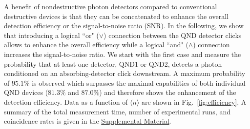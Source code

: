 \documentclass[prl,twocolumn,amsmath,amssymb,bibnotes,aps,longbibliography]{revtex4-1}
\newcommand{\braket}[1]{\langle{#1}\rangle}
\begin{document}
A benefit of nondestructive photon detectors compared to conventional destructive devices is that they can be concatenated to enhance the overall detection efficiency or the signal-to-noise ratio (SNR). In the following, we show that introducing a logical ``or" ($\lor$) connection between the QND detector clicks allows to enhance the overall efficiency while a logical ``and" ($\land$) connection increases the signal-to-noise ratio. We start with the first case and measure the probability that at least one detector, QND1 or QND2, detects a photon conditioned on an absorbing-detector click downstream. A maximum probability of $95.1\%$ is observed which surpasses the maximal capabilities of both individual QND devices ($81.3\%$ and $87.0\%$) and therefore shows the enhancement of the detection efficiency. Data as a function of $\braket{n}$ are shown in Fig.~\ref{fig:efficiency}. A summary of the total measurement time, number of experimental runs, and coincidence rates is given in the \hyperref[supplement]{Supplemental Material}. 
\end{document}
